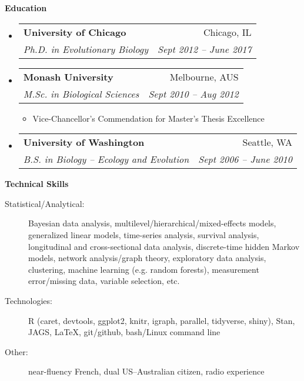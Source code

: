 \documentclass[letterpaper,11pt]{article}
\makeatletter
\newcommand{\resheading}[1]{{\large \colorbox{mygrey}{\begin{minipage}{\textwidth}{\textbf{#1 \vphantom{p\^{E}}}}\end{minipage}}}}
\newcommand{\ressubheading}[4]{
  \begin{tabular*}{6.5in}{l@{\extracolsep{\fill}}r}
    \textbf{#1} & #2 \\
    \textit{#3} & \textit{#4} \\
\end{tabular*}\vspace{-6pt}}
\makeatother
\begin{document}
\resheading{Education}
\begin{itemize}
  \item
    \ressubheading{University of Chicago}{Chicago, IL}{Ph.D. in Evolutionary Biology}{Sept 2012 -- June 2017}
  \item
    \ressubheading{Monash University}{Melbourne, AUS}{M.Sc. in Biological Sciences}{Sept 2010 -- Aug 2012}
    \begin{itemize}
      \item Vice-Chancellor's Commendation for Master's Thesis Excellence
    \end{itemize}
  \item
    \ressubheading{University of Washington}{Seattle, WA}{B.S. in Biology -- Ecology and Evolution}{Sept 2006 -- June 2010}
\end{itemize} %



%

\vspace{0.25in}
\resheading{Technical Skills}
\begin{description}
  \item[Statistical/Analytical:] { \footnotesize Bayesian data analysis, multilevel/hierarchical/mixed-effects models, generalized linear models, time-series analysis, survival analysis, longitudinal and cross-sectional data analysis, discrete-time hidden Markov models, network analysis/graph theory, exploratory data analysis, clustering, machine learning (e.g. random forests), measurement error/missing data, variable selection, etc. }
  \item[Technologies:] { \footnotesize R (caret, devtools, ggplot2, knitr, igraph, parallel, tidyverse, shiny), Stan, JAGS, \LaTeX, git/github, bash/Linux command line }
  \item[Other:] { \footnotesize near-fluency French, dual US--Australian citizen, radio experience }
\end{description} %
\vspace{0.25in}

\end{document}
